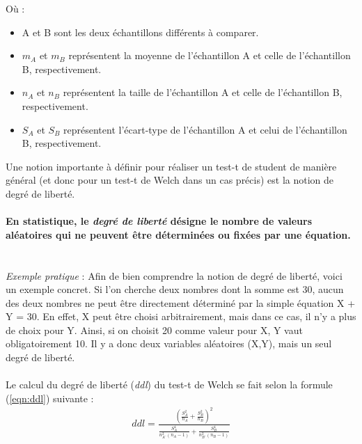\documentclass[10pt, oneside, a4paper]{article}
\begin{document}
Où :
\begin{itemize}
\item A et B sont les deux échantillons différents à comparer.
\item $m_{A}$ et $m_{B}$ représentent la moyenne de l'échantillon A et celle de l'échantillon B, respectivement.
\item $n_{A}$ et $n_{B}$ représentent la taille de l'échantillon A et celle de l'échantillon B, respectivement.
\item $S_{A}$ et $S_{B}$ représentent l’écart-type de l'échantillon A et celui de l'échantillon B, respectivement. \\
\end{itemize}
Une notion importante à définir pour réaliser un test-t de student de manière général (et donc pour un test-t de Welch dans un cas précis) est la notion de degré de liberté. \\ \\
\textbf{En statistique, le \textit{degré de liberté} désigne le nombre de valeurs aléatoires qui ne peuvent être déterminées ou fixées par une équation.} \\ \\ \\
\textit{Exemple pratique} : Afin de bien comprendre la notion de degré de liberté, voici un exemple concret. 
Si l'on cherche deux nombres dont la somme est 30, aucun des deux nombres ne peut être directement déterminé par la simple équation X + Y = 30. En effet, X peut être choisi arbitrairement, mais dans ce cas, il n'y a plus de choix pour Y. Ainsi, si on choisit  20 comme valeur pour X, Y vaut obligatoirement 10. Il y a donc deux variables aléatoires (X,Y), mais un seul degré de liberté. \\ \\
Le calcul du degré de liberté (\textit{ddl}) du test-t de Welch se fait selon la formule (\ref{eqn:ddl}) suivante :
\begin{gather}
	ddl =\frac{(\frac{S_{A}^2}{n_{A}} +\frac{S_{B}^2}{n_{B}})^2}{\frac{S_{A}^4}{n_{A}^2.(n_{A}-1)}+\frac{S_{B}^4}{n_{B}^2.(n_{B}-1)}}\label{eqn:ddl}
\end{gather}
\end{document}
